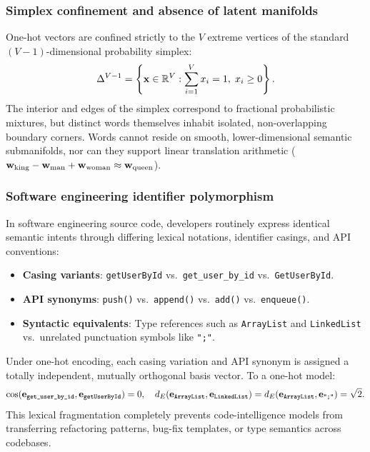 \documentclass[../../../main.tex]{subfiles}
\begin{document}
\subsubsection{Simplex confinement and absence of latent manifolds}
One-hot vectors are confined strictly to the $V$ extreme vertices of the standard $(V-1)$-dimensional probability simplex:
\begin{equation}
\label{eq:standard_simplex}
\Delta^{V-1} = \left\{ \mathbf{x} \in \mathbb{R}^V : \sum_{i=1}^V x_i = 1, \; x_i \ge 0 \right\}.
\end{equation}
The interior and edges of the simplex correspond to fractional probabilistic mixtures, but distinct words themselves inhabit isolated, non-overlapping boundary corners. Words cannot reside on smooth, lower-dimensional semantic submanifolds, nor can they support linear translation arithmetic ($\mathbf{w}_{\text{king}} - \mathbf{w}_{\text{man}} + \mathbf{w}_{\text{woman}} \approx \mathbf{w}_{\text{queen}}$).

\subsubsection{Software engineering identifier polymorphism}
In software engineering source code, developers routinely express identical semantic intents through differing lexical notations, identifier casings, and API conventions:
\begin{itemize}
    \item \textbf{Casing variants}: \texttt{getUserById} vs.~\texttt{get\_user\_by\_id} vs.~\texttt{GetUserById}.
    \item \textbf{API synonyms}: \texttt{push()} vs.~\texttt{append()} vs.~\texttt{add()} vs.~\texttt{enqueue()}.
    \item \textbf{Syntactic equivalents}: Type references such as \texttt{ArrayList} and \texttt{LinkedList} vs.~unrelated punctuation symbols like \texttt{";"}.
\end{itemize}
Under one-hot encoding, each casing variation and API synonym is assigned a totally independent, mutually orthogonal basis vector. To a one-hot model:
\begin{equation}
\label{eq:code_syntax_equidistance}
\cos(\mathbf{e}_{\text{\texttt{get\_user\_by\_id}}}, \mathbf{e}_{\text{\texttt{getUserById}}}) = 0, \quad d_E(\mathbf{e}_{\text{\texttt{ArrayList}}}, \mathbf{e}_{\text{\texttt{LinkedList}}}) = d_E(\mathbf{e}_{\text{\texttt{ArrayList}}}, \mathbf{e}_{\text{\texttt{";"}}}) = \sqrt{2}.
\end{equation}
This lexical fragmentation completely prevents code-intelligence models from transferring refactoring patterns, bug-fix templates, or type semantics across codebases.
\end{document}

